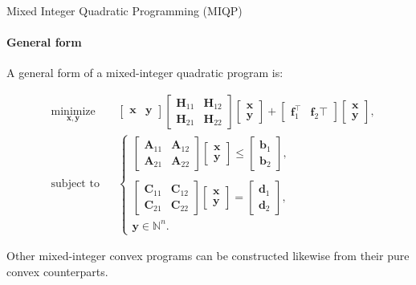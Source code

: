 \documentclass{beamer}
\begin{document}
\begin{frame}{Mixed Integer Quadratic Programming (MIQP)}
\framesubtitle{General form}
\begin{flushleft}

A general form of a mixed-integer quadratic program is:

%
\begin{equation} \label{QP}
\begin{aligned}
& \underset{\mathbf{x}, \mathbf{y}}{\text{minimize}}
& & 
\begin{bmatrix}
\mathbf{x} & \mathbf{y}
\end{bmatrix}
\begin{bmatrix}
\mathbf{H}_{11} & \mathbf{H}_{12} \\
\mathbf{H}_{21} & \mathbf{H}_{22}
\end{bmatrix} 
\begin{bmatrix}
\mathbf{x} \\
\mathbf{y}
\end{bmatrix} +
\begin{bmatrix}
\mathbf{f}_1^\top & \mathbf{f}_2\top
\end{bmatrix}
\begin{bmatrix}
\mathbf{x} \\
\mathbf{y}
\end{bmatrix}, \\
& \text{subject to}
& & \begin{cases} 
\begin{bmatrix}
\mathbf{A}_{11} & \mathbf{A}_{12} \\
\mathbf{A}_{21} & \mathbf{A}_{22}
\end{bmatrix} 
\begin{bmatrix}
\mathbf{x} \\
\mathbf{y}
\end{bmatrix}
\leq 
\begin{bmatrix}
\mathbf{b}_1 \\
\mathbf{b}_2
\end{bmatrix}, \\ 
\\
\begin{bmatrix}
\mathbf{C}_{11} & \mathbf{C}_{12} \\
\mathbf{C}_{21} & \mathbf{C}_{22}
\end{bmatrix} 
\begin{bmatrix}
\mathbf{x} \\
\mathbf{y}
\end{bmatrix} = 
\begin{bmatrix}
\mathbf{d}_1 \\
\mathbf{d}_2
\end{bmatrix},  \\
\mathbf{y} \in \mathbb{N}^n.
\end{cases}
%
\end{aligned}
\end{equation}
 
Other mixed-integer convex programs can be constructed likewise  from their pure convex counterparts.
 
\end{flushleft}
\end{frame}
\end{document}
